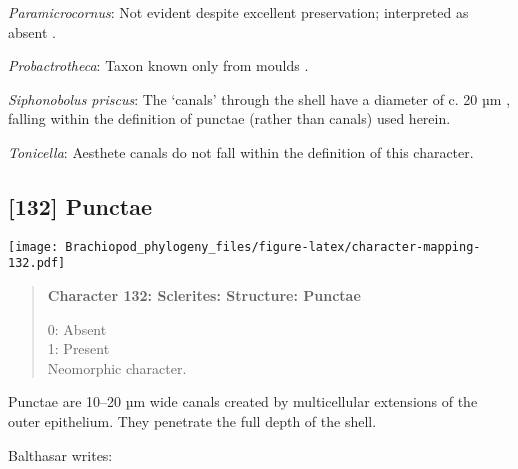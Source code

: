 \documentclass[openany]{book}
\theoremstyle{definition}
\theoremstyle{definition}
\theoremstyle{definition}
\theoremstyle{remark}
\begin{document}
\hypertarget{Paramicrocornus-coding-131}{}
\emph{Paramicrocornus}: Not evident despite excellent preservation;
interpreted as absent \citep{Zhang2018Ahyolithid}.

\hypertarget{Probactrotheca-coding-131}{}
\emph{Probactrotheca}: Taxon known only from moulds \citep{Valent2012}.

\hypertarget{Siphonobolus_priscus-coding-131}{}
\emph{Siphonobolus priscus}: The `canals' through the shell have a
diameter of c. 20 µm \citep[text-fig. 2a]{Williams2004Chemicostructure},
falling within the definition of punctae (rather than canals) used
herein.

\hypertarget{Tonicella-coding-131}{}
\emph{Tonicella}: Aesthete canals do not fall within the definition of
this character.

\subsection*{{[}132{]} Punctae}\label{punctae}

\texttt{[image: Brachiopod\_phylogeny\_files/figure-latex/character-mapping-132.pdf]}

\begin{quote}
\textbf{Character 132: Sclerites: Structure: Punctae}

0: Absent\\
1: Present\\
Neomorphic character.
\end{quote}

Punctae are 10--20 µm wide canals created by multicellular extensions of
the outer epithelium. They penetrate the full depth of the shell.

Balthasar \citeyearpar{Balthasar2008iMummpikia} writes:
\end{document}
